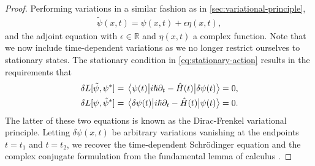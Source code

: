         \begin{proof}
            Performing variations in a similar fashion as in
            \autoref{sec:variational-principle},
            \begin{gather}
                \tilde{\psi}(x, t) = \psi(x, t) + \epsilon\eta(x, t),
            \end{gather}
            and the adjoint equation with $\epsilon \in \mathbb{R}$ and $\eta(x,
            t)$ a complex function.
            Note that we now include time-dependent variations as we no longer
            restrict ourselves to stationary states.
            The stationary condition in \autoref{eq:stationary-action} results
            in the requirements that
            \begin{gather}
                \delta L[\tilde{\psi}, \psi^{*}]
                = \mel{\psi(t)}{i\hslash\partial_t - \hat{H}(t)}{\delta\psi(t)}
                = 0, \\
                \delta L[\psi, \tilde{\psi}^{*}]
                = \mel{\delta\psi(t)}{i\hslash\partial_t - \hat{H}(t)}{\psi(t)}
                = 0.
            \end{gather}
            The latter of these two equations is known as the Dirac-Frenkel
            variational principle.
            Letting $\delta\psi(x, t)$ be arbitrary variations vanishing at the
            endpoints $t = t_1$ and $t = t_2$, we recover the
            time-dependent Schrödinger equation and the complex conjugate
            formulation from the fundamental lemma of calculus \cite{frenkel,
            wiki:fundamental-lemma}.
        \end{proof}

